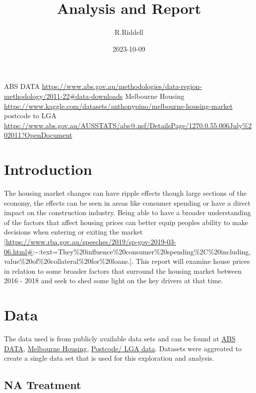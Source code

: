 \documentclass[
]{article}
\title{Analysis and Report}
\author{R.Riddell}
\date{2023-10-09}
\begin{document}
\maketitle

{
\setcounter{tocdepth}{1}
\tableofcontents
}
ABS DATA
\url{https://www.abs.gov.au/methodologies/data-region-methodology/2011-22\#data-downloads}
Melbourne Housing
\url{https://www.kaggle.com/datasets/anthonypino/melbourne-housing-market}
postcode to LGA
\url{https://www.abs.gov.au/AUSSTATS/abs@.nsf/DetailsPage/1270.0.55.006July\%202011?OpenDocument}

\hypertarget{introduction}{%
\section{Introduction}\label{introduction}}

The housing market changes can have ripple effects though large sections
of the economy, the effects can be seen in areas like consumer spending
or have a direct impact on the construction industry. Being able to have
a broader understanding of the factors that affect housing prices can
better equip peoples ability to make decisions when entering or exiting
the market
{[}\url{https://www.rba.gov.au/speeches/2019/sp-gov-2019-03-06.html\#}:\textasciitilde:text=They\%20influence\%20consumer\%20spending\%2C\%20including,value\%20of\%20collateral\%20for\%20loans.{]}.
This report will examine house prices in relation to some broader
factors that surround the housing market between 2016 - 2018 and seek to
shed some light on the key drivers at that time.

\hypertarget{data}{%
\section{Data}\label{data}}

The data used is from publicly available data sets and can be found at
\href{https://www.abs.gov.au/methodologies/data-region-methodology/2011-22\#data-downloads}{ABS
DATA},
\href{https://www.kaggle.com/datasets/anthonypino/melbourne-housing-market}{Melbourne
Housing},
\href{https://www.abs.gov.au/AUSSTATS/abs@.nsf/DetailsPage/1270.0.55.006July\%202011?OpenDocument}{Postcode/
LGA data}. Datasets were aggreated to create a single data set that is
used for this exploration and analysis.

\hypertarget{na-treatment}{%
\subsection{NA Treatment}\label{na-treatment}}
\end{document}
